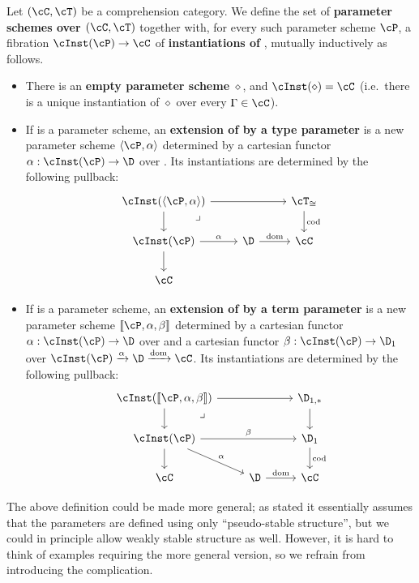 \documentclass[referee]{psp}
\let\P\cP
\def\emptyps{\diamond}
\def\typeps#1#2{\langle #1,#2\rangle}
\def\termps#1#2#3{\llbracket #1,#2,#3\rrbracket}
\let\C\cC
\let\T\cT
\def\pullback#1{\ar[#1,phantom,near start,"\lrcorner"]}
\begin{document}
\begin{defn}\label{defn:param-scheme}
  Let $(\C,\T)$ be a comprehension category.
  We define the set of \textbf{parameter schemes over $(\C,\T)$} together with, for every such parameter scheme $\P$, a fibration $\cInst(\P)\to\C$ of \textbf{instantiations of \P}, mutually inductively as follows.
  \begin{itemize}
  \item There is an \textbf{empty parameter scheme} $\emptyps$, and $\cInst(\emptyps) = \C$ (i.e.\ there is a unique instantiation of $\emptyps$ over every $\Gamma\in\C$).
  \item If \P is a parameter scheme, an \textbf{extension of \P by a type parameter} is a new parameter scheme $\typeps{\P}{\al}$ determined by a cartesian functor $\al:\cInst(\P)\to\D$ over \C.
    Its instantiations are determined by the following pullback:
    \[
    \begin{tikzcd}
      \cInst(\typeps{\P}{\al}) \ar[rr] \ar[d] \pullback{dr} && \T_{\cong} \ar[d,"\mathrm{cod}"] \\
      \cInst(\P) \ar[r,"\al"] \ar[d] & \D \ar[r,"\mathrm{dom}"] & \C\\
      \C
    \end{tikzcd}
    \]
  \item If \P is a parameter scheme, an \textbf{extension of \P by a term parameter} is a new parameter scheme $\termps\P\al\be$ determined by a cartesian functor $\al:\cInst(\P)\to\D$ over \C and a cartesian functor $\be:\cInst(\P) \to \D_1$ over $\cInst(\P) \xto{\al} \D \xto{\mathrm{dom}} \C$.
    Its instantiations are determined by the following pullback:
    \[
    \begin{tikzcd}
      \cInst(\termps{\P}{\al}{\be}) \ar[rr] \ar[d] \pullback{dr} & & \D_{1,*} \ar[d] \\
      \cInst(\P) \ar[dr,"\al"] \ar[d] \ar[rr,"\be"] & \phantom{.} & \D_1 \ar[d,"\mathrm{cod}"]\\
      \C & \D \ar[r,"\mathrm{dom}"] & \C
    \end{tikzcd}
    \]
  \end{itemize}
\end{defn}

\begin{rmk}{}
  The above definition could be made more general; as stated it essentially assumes that the parameters are defined using only ``pseudo-stable structure'', but we could in principle allow weakly stable structure as well.
  However, it is hard to think of examples requiring the more general version, so we refrain from introducing the complication.
\end{rmk}
\end{document}
